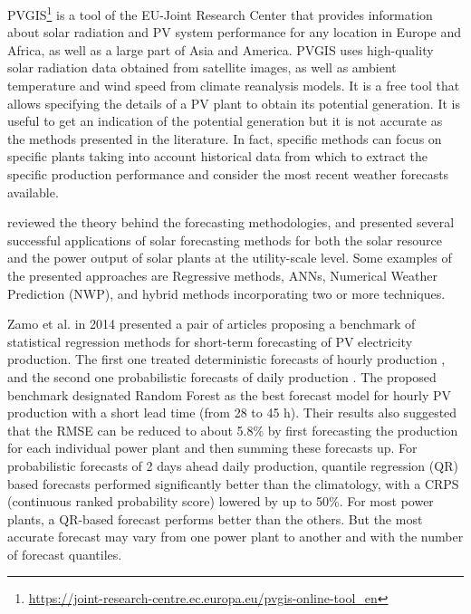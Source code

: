 PVGIS\footnote{ \url{https://joint-research-centre.ec.europa.eu/pvgis-online-tool_en} } is a tool of the EU-Joint Research Center that provides information about solar radiation and PV system performance for any location in Europe and Africa, as well as a large part of Asia and America.
PVGIS uses high-quality solar radiation data obtained from satellite images, as well as ambient temperature and wind speed from climate reanalysis models.
It is a free tool that allows specifying the details of a PV plant to obtain its potential generation.
It is useful to get an indication of the potential generation but it is not accurate as the methods presented in the literature.
In fact, specific methods can focus on specific plants taking into account historical data from which to extract the specific production performance and consider the most recent weather forecasts available.

\cite{INMAN2013535} reviewed the theory behind the forecasting methodologies, and presented several successful applications of solar forecasting methods for both the solar resource and the power output of solar plants at the utility-scale level.
Some examples of the presented approaches are Regressive methods, ANNs, Numerical Weather Prediction (NWP), and hybrid methods incorporating two or more techniques.

Zamo et al. in 2014 presented a pair of articles proposing a benchmark of statistical regression methods for short-term forecasting of PV electricity production.
The first one treated deterministic forecasts of hourly production \cite{ZAMO2014792}, and the second one probabilistic forecasts of daily production \cite{ZAMO2014804}.
The proposed benchmark designated Random Forest as the best forecast model for hourly PV production with a short lead time (from 28 to 45 h).
Their results also suggested that the RMSE can be reduced to about 5.8\% by first forecasting the production for each individual power plant and then summing these forecasts up.
For probabilistic forecasts of 2 days ahead daily production, quantile regression (QR) based forecasts performed significantly better than the climatology, with a CRPS (continuous ranked probability score) lowered by up to 50\%.
For most power plants, a QR-based forecast performs better than the others.
But the most accurate forecast may vary from one power plant to another and with the number of forecast quantiles.

